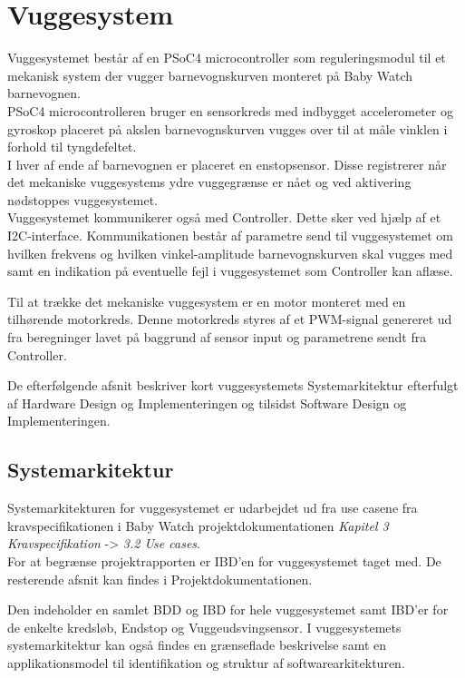 \chapter{Vuggesystem}\label{vuggesys}
Vuggesystemet består af en PSoC4 microcontroller som reguleringsmodul til et mekanisk system der vugger barnevognskurven monteret på Baby Watch barnevognen. \\ PSoC4 microcontrolleren bruger en sensorkreds med indbygget accelerometer og gyroskop placeret på akslen barnevognskurven vugges over til at måle vinklen i forhold til tyngdefeltet. \\ I hver af ende af barnevognen er placeret en enstopsensor. Disse registrerer når det mekaniske vuggesystems ydre vuggegrænse er nået og ved aktivering nødstoppes vuggesystemet. \\ Vuggesystemet kommunikerer også med Controller. Dette sker ved hjælp af et I2C-interface. Kommunikationen består af parametre send til vuggesystemet om hvilken frekvens og hvilken vinkel-amplitude barnevognskurven skal vugges med samt en indikation på eventuelle fejl i vuggesystemet som Controller kan aflæse.

Til at trække det mekaniske vuggesystem er en motor monteret med en tilhørende motorkreds. Denne motorkreds styres af et PWM-signal genereret ud fra beregninger lavet på baggrund af sensor input og parametrene sendt fra Controller.

De efterfølgende afsnit beskriver kort vuggesystemets Systemarkitektur efterfulgt af Hardware Design og Implementeringen og tilsidst Software Design og Implementeringen.

\section{Systemarkitektur}
\label{vs_sysark}
Systemarkitekturen for vuggesystemet er udarbejdet ud fra use casene fra kravspecifikationen i Baby Watch projektdokumentationen \textit{Kapitel 3 Kravspecifikation} -> \textit{3.2 Use cases}. \\ For at begrænse projektrapporten er IBD'en for vuggesystemet taget med. De resterende afsnit kan findes i Projektdokumentationen.


Den indeholder en samlet BDD og IBD for hele vuggesystemet samt IBD'er for de enkelte kredsløb, Endstop og Vuggeudsvingsensor. I vuggesystemets systemarkitektur kan også findes en grænseflade beskrivelse samt en applikationsmodel til identifikation og struktur af softwarearkitekturen.


